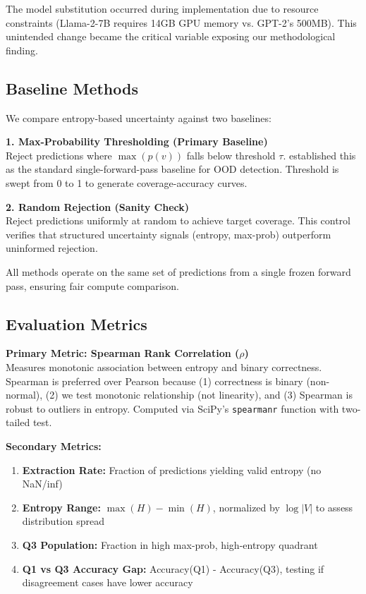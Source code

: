 The model substitution occurred during implementation due to resource constraints (Llama-2-7B requires 14GB GPU memory vs. GPT-2's 500MB). This unintended change became the critical variable exposing our methodological finding.

\subsection{Baseline Methods}

We compare entropy-based uncertainty against two baselines:

\textbf{1. Max-Probability Thresholding (Primary Baseline)}\\
Reject predictions where $\max(p(v))$ falls below threshold $\tau$. \citet{Hendrycks2017} established this as the standard single-forward-pass baseline for OOD detection. Threshold is swept from 0 to 1 to generate coverage-accuracy curves.

\textbf{2. Random Rejection (Sanity Check)}\\
Reject predictions uniformly at random to achieve target coverage. This control verifies that structured uncertainty signals (entropy, max-prob) outperform uninformed rejection.

All methods operate on the same set of predictions from a single frozen forward pass, ensuring fair compute comparison.

\subsection{Evaluation Metrics}

\textbf{Primary Metric: Spearman Rank Correlation ($\rho$)}\\
Measures monotonic association between entropy and binary correctness. Spearman is preferred over Pearson because (1) correctness is binary (non-normal), (2) we test monotonic relationship (not linearity), and (3) Spearman is robust to outliers in entropy. Computed via SciPy's \texttt{spearmanr} function with two-tailed test.

\textbf{Secondary Metrics:}

\begin{enumerate}
\item \textbf{Extraction Rate:} Fraction of predictions yielding valid entropy (no NaN/inf)
\item \textbf{Entropy Range:} $\max(H) - \min(H)$, normalized by $\log|V|$ to assess distribution spread
\item \textbf{Q3 Population:} Fraction in high max-prob, high-entropy quadrant
\item \textbf{Q1 vs Q3 Accuracy Gap:} Accuracy(Q1) - Accuracy(Q3), testing if disagreement cases have lower accuracy
\end{enumerate}

